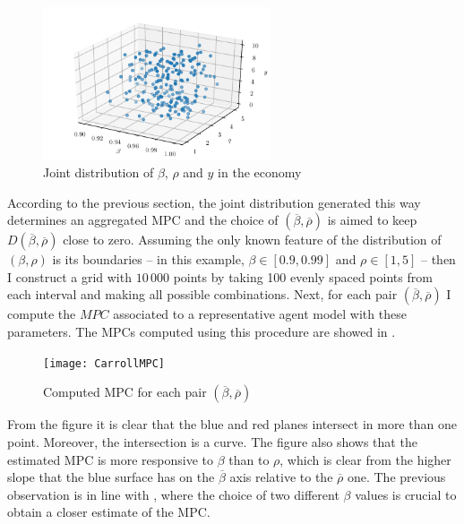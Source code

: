 \documentclass[english, a4paper, 12pt]{article}
\begin{document}
	
	\begin{figure}[H]
		\caption{Joint distribution of $\beta$, $\rho$ and $y$ in the economy}
		\label{fig:JointDistrib}
		\includegraphics[width=0.6\textwidth]{CarrollDistrib3d}
	\end{figure}

According to the previous section, the joint distribution generated this way determines an aggregated MPC and the choice of $(\overline{\beta}, \overline{\rho})$ is aimed to keep $D(\overline{\beta}, \overline{\rho})$ close to zero. Assuming the only known feature of the distribution of $(\beta, \rho)$ is its boundaries -- in this example, $\beta \in [0.9, 0.99]$ and $\rho \in [1,5]$ -- then I construct a grid with $10\,000$ points by taking 100 evenly spaced points from each interval and making all possible combinations. Next, for each pair $(\overline{\beta}, \overline{\rho})$ I compute the $MPC$ associated to a representative agent model with these parameters. The MPCs computed using this procedure are showed in . 
	\begin{figure}[H]
		\caption{Computed MPC for each pair $(\overline{\beta}, \overline{\rho})$}
		\label{fig:MPCPlane}
		\texttt{[image: CarrollMPC]}
	\end{figure}

\newpage
From the figure it is clear that the blue and red planes intersect in more than one point. Moreover, the intersection is a curve. The figure also shows that the estimated MPC is more responsive to $\beta$ than to $\rho$, which is clear from the higher slope that the blue surface has on the $\overline{\beta}$ axis relative to the $\overline{\rho}$ one. The previous observation is in line with \cite{CarrollRequiem}, where the choice of two different $\beta$ values is crucial to obtain a closer estimate of the MPC. 
\end{document}
